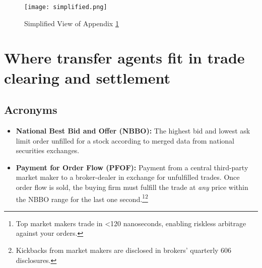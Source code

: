 \documentclass[11pt, english]{article}
\begin{document}
\begin{figure}[H]
    \centering
    \texttt{[image: simplified.png]}
    \caption{Simplified View of Appendix \ref{appendix-brokers}}
\end{figure}
\pagebreak



\section{Where transfer agents fit in trade clearing and settlement}\label{appendix-brokers}


\subsection*{Acronyms}

\begin{itemize}
  \item \textbf{National Best Bid and Offer (NBBO):} The highest bid and lowest ask limit order unfilled for a stock according to merged data from national securities exchanges.
  
  \item \textbf{Payment for Order Flow (PFOF):} Payment from a central third-party market maker to a broker-dealer in exchange for unfulfilled trades. Once order flow is sold, the buying firm must fulfill the trade at \textit{any} price within the NBBO range for the last one second.\footnote{Top market makers trade in <120 nanoseconds, enabling riskless arbitrage against your orders.}\footnote{Kickbacks from market makers are disclosed in brokers' quarterly 606 disclosures.}
\end{itemize}
\end{document}
